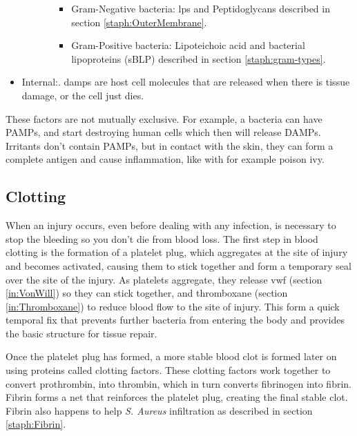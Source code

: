 \begin{itemize}
\begin{itemize}
\begin{itemize}
\begin{itemize}
                            \item Gram-Negative bacteria: \gls{lps} and Peptidoglycans described in section \ref{staph:OuterMembrane}.
                            
                            \item Gram-Positive bacteria: Lipoteichoic acid and bacterial lipoproteins (sBLP) described in section \ref{staph:gram-types}.

                        \end{itemize}

                \end{itemize}

        \end{itemize}

    \item {Internal:}. \gls{damps} are host cell molecules that are released when there is tissue damage, or the cell just dies.
            
\end{itemize}

These factors are not mutually exclusive. For example, a bacteria can have PAMPs, and start destroying human cells which then will release DAMPs. Irritants don't contain PAMPs, but in contact with the skin, they can form a complete antigen and cause inflammation, like with for example poison ivy.

\subsection{Clotting}

When an injury occurs, even before dealing with any infection, is necessary to stop the bleeding so you don't die from blood loss. The first step in blood clotting is the formation of a platelet plug, which aggregates at the site of injury and becomes activated, causing them to stick together and form a temporary seal over the site of the injury. As platelets aggregate, they release \gls{vwf} (section \ref{in:VonWill}) so they can stick together, and thromboxane (section \ref{in:Thromboxane}) to reduce blood flow to the site of injury. This form a quick temporal fix that prevents further bacteria from entering the body and provides the basic structure for tissue repair.

Once the platelet plug has formed, a more stable blood clot is formed later on using proteins called clotting factors. These clotting factors work together to convert prothrombin, into thrombin, which in turn converts fibrinogen into fibrin. Fibrin forms a net that reinforces the platelet plug, creating the final stable clot. Fibrin also happens to help \textit{S. Aureus} infiltration as described in section \ref{staph:Fibrin}.

